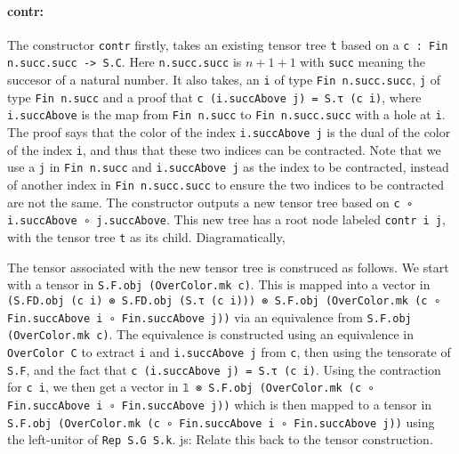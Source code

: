 \documentclass[a4paper, 11pt]{article}
\newcommand{\js}[1]{ {\color{magenta} js:  #1}}
\newcommand{\tensorTree}[1]{
\begin{center}
  \fcolorbox{mycolor}{white}{%
#1}
\end{center}
}
\begin{document}
\paragraph{contr:}
The constructor \lstinline|contr| firstly, takes an existing tensor tree \lstinline|t| based on a 
\lstinline|c : Fin n.succ.succ -> S.C|. Here \lstinline|n.succ.succ| is $n + 1 + 1$ with \lstinline|succ| meaning 
the succesor of a natural number. 
It also takes,
an \lstinline|i| of type \lstinline|Fin n.succ.succ|, \lstinline|j| of type \lstinline|Fin n.succ|
and a proof that \lstinline|c (i.succAbove j) = S.τ (c i)|, where \lstinline|i.succAbove| is the map from \lstinline|Fin n.succ| to \lstinline|Fin n.succ.succ| with a hole at \lstinline|i|. 
The proof says that the color of the index \lstinline|i.succAbove j| is the dual of the color of the index \lstinline|i|, and thus that these 
two indices can be contracted.
Note that we use a \lstinline|j| in \lstinline|Fin n.succ| and \lstinline|i.succAbove j| as the index to be contracted, instead 
of another index in  \lstinline|Fin n.succ.succ| to ensure the two indices to be contracted are not the same. 
The constructor outputs a new tensor tree based on \lstinline|c ∘ i.succAbove ∘ j.succAbove|. 
This new tree has a root node labeled \lstinline|contr i j|, with the tensor tree \lstinline|t| as its child.
Diagramatically, 
\tensorTree{
  \begin{tikzpicture}
    \node[draw=black] (A) at (0,0) {\lstinline|contr i j|};
    \node (B) at (0,-1) {\lstinline|t|};
    \draw[->] (A) -- (B);
  \end{tikzpicture} 
}
The tensor associated with the new tensor tree is construced as follows. 
We start with a tensor in \lstinline|S.F.obj (OverColor.mk c)|.
This is mapped into a vector in \lstinline|(S.FD.obj (c i) ⊗ S.FD.obj (S.τ (c i))) ⊗ S.F.obj (OverColor.mk (c ∘ Fin.succAbove i ∘ Fin.succAbove j))| via an equivalence from 
\lstinline|S.F.obj (OverColor.mk c)|. The equivalence is constructed using an equivalence 
in \lstinline|OverColor C| to extract \lstinline|i| and \lstinline|i.succAbove j| from \lstinline|c|,
then using the tensorate of \lstinline|S.F|, and the fact that \lstinline|c (i.succAbove j) = S.τ (c i)|. 
Using the contraction for \lstinline|c i|, we then get a vector in 
\lstinline|𝟙 ⊗ S.F.obj (OverColor.mk (c ∘ Fin.succAbove i ∘ Fin.succAbove j))| which is then 
mapped to a tensor in \lstinline|S.F.obj (OverColor.mk (c ∘ Fin.succAbove i ∘ Fin.succAbove j))| 
using the left-unitor of \lstinline|Rep S.G S.k|.
\js{Relate this back to the tensor construction.}
\end{document}
